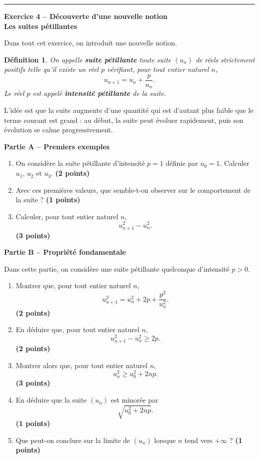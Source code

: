\documentclass[11pt,a4paper]{article}
\newcommand{\bareme}[1]{\hfill{\color{blue!70!black}\textbf{(#1 points)}}}
\newtheorem*{definition}{Définition}
\begin{document}
\vspace{0.4cm}
\hrule
\vspace{0.4cm}
\newpage
\begin{center}
    \textbf{\large Exercice 4 -- Découverte d’une nouvelle notion}\\
    \textbf{Les suites pétillantes}
\end{center}

Dans tout cet exercice, on introduit une nouvelle notion.

\begin{definition}
On appelle \textbf{suite pétillante} toute suite $(u_n)$ de réels strictement positifs telle qu’il existe un réel $p$ vérifiant, pour tout entier naturel $n$,
\[
u_{n+1}=u_n+\frac{p}{u_n}.
\]
Le réel $p$ est appelé \textbf{intensité pétillante} de la suite.
\end{definition}

L’idée est que la suite augmente d’une quantité qui est d’autant plus faible que le terme courant est grand : au début, la suite peut évoluer rapidement, puis son évolution se calme progressivement.

\medskip

\textbf{Partie A -- Premiers exemples}

\begin{enumerate}[label=\textbf{A.\arabic*.}, leftmargin=0.9cm]
    \item On considère la suite pétillante d’intensité $p=1$ définie par $u_0=1$.
    Calculer $u_1$, $u_2$ et $u_3$. \bareme{2}
    \item Avec ces premières valeurs, que semble-t-on observer sur le comportement de la suite ? \bareme{1}
    \item Calculer, pour tout entier naturel $n$,
    \[
    u_{n+1}^2-u_n^2.
    \]
    \bareme{3}
\end{enumerate}

\medskip

\textbf{Partie B -- Propriété fondamentale}

Dans cette partie, on considère une suite pétillante quelconque d’intensité $p>0$.

\begin{enumerate}[label=\textbf{B.\arabic*.}, leftmargin=0.9cm]
    \item Montrer que, pour tout entier naturel $n$,
    \[
    u_{n+1}^2=u_n^2+2p+\frac{p^2}{u_n^2}.
    \]
    \bareme{2}
    \item En déduire que, pour tout entier naturel $n$,
    \[
    u_{n+1}^2-u_n^2\geq 2p.
    \]
    \bareme{2}
    \item Montrer alors que, pour tout entier naturel $n$,
    \[
    u_n^2\geq u_0^2+2np.
    \]
    \bareme{3}
    \item En déduire que la suite $(u_n)$ est minorée par
    \[
    \sqrt{u_0^2+2np}.
    \]
    \bareme{1}
    \item Que peut-on conclure sur la limite de $(u_n)$ lorsque $n$ tend vers $+\infty$ ? \bareme{1}
\end{enumerate}
\end{document}
